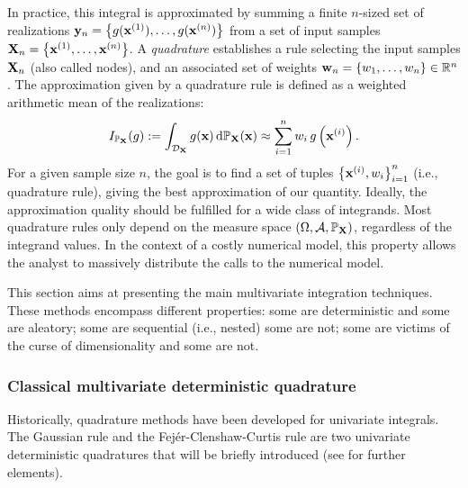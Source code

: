 In practice, this integral is approximated by summing a finite $n$-sized set of realizations ${\bf y}_n = \left\{g({\bf x}^{(1)}), \dots, g({\bf x}^{(n)})\right\}$ from a set of input samples ${\bf X}_n = \left\{{\bf x}^{(1)}, \dots, {\bf x}^{(n)}\right\}$. 
A \textit{quadrature} establishes a rule selecting the input samples ${\bf X}_n$ (also called nodes), and an associated set of weights ${\bf w}_n = \{w_1, \dots, w_n\} \in \mathbb{R}^n$. 
The approximation given by a quadrature rule is defined as a weighted arithmetic mean of the realizations:
\begin{equation}
    I_{\mathbb{P}_{{\bf X}}}(g) := \int_{\mathcal{D}_{\bf X}} g({\bf x}) \, \mathrm{d}\mathbb{P}_{{\bf X}}({\bf x}) \approx \sum_{i=1}^n w_i \, g\left({\bf x}^{(i)}\right).
\end{equation}
For a given sample size $n$, the goal is to find a set of tuples $\left\{{\bf x}^{(i)}, w_i \right\}_{i=1}^n$ (i.e., quadrature rule), giving the best approximation of our quantity. 
Ideally, the approximation quality should be fulfilled for a wide class of integrands. 
Most quadrature rules only depend on the measure space $(\Omega, \mathcal{A}, \mathbb{P}_{{\bf X}})$, regardless of the integrand values. 
In the context of a costly numerical model, this property allows the analyst to massively distribute the calls to the numerical model. 

This section aims at presenting the main multivariate integration techniques. 
These methods encompass different properties: 
some are deterministic and some are aleatory; 
some are sequential (i.e., nested) some are not; 
some are victims of the curse of dimensionality and some are not. 


\subsubsection{Classical multivariate deterministic quadrature}

Historically, quadrature methods have been developed for univariate integrals. 
The Gaussian rule and the Fejér-Clenshaw-Curtis rule are two univariate deterministic quadratures that will be briefly introduced (see \citealt{sullivan_2015} for further elements). 


